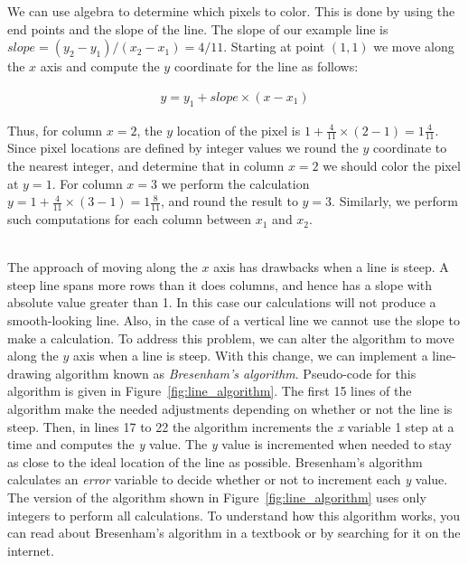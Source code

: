 \documentclass[epsfig,10pt,fullpage]{article}
\begin{document}
We can use algebra to determine which pixels to color. This is done by using the end points and 
the slope of the line. The slope of our example line is $slope = (y_2 - y_1)/(x_2 - x_1) = 4/11$. 
Starting at point $(1,1)$ we move along the $x$ axis and compute the $y$ coordinate for the 
line as follows:

\begin{eqnarray*}
y = y_1 + slope \times (x - x_1)
\end{eqnarray*}

Thus, for column $x = 2$, the $y$ location of the pixel is
$1 + \frac{4}{11} \times (2-1) = 1 \frac{4}{11}$. 
Since pixel locations are defined by integer values we round the $y$ coordinate to the nearest 
integer, and determine that in column $x = 2$ we should color the pixel at $y = 1$. For
column $x = 3$ we perform the calculation $y = 1 + \frac{4}{11} \times (3-1) = 1
\frac{8}{11}$, and round the result to $y = 3$.  Similarly, we perform such computations 
for each column between $x_1$ and $x_2$.

~\\
The approach of moving along the $x$ axis has drawbacks when a line is steep. A steep line
spans more rows than it does columns, and hence has a slope with absolute value greater than 
1.  In this case our calculations will not produce a smooth-looking line.  Also, in the case
of a vertical line we cannot use the slope to make a calculation.  To address this 
problem, we can alter the algorithm to move along the $y$ axis when a line is steep. With 
this change, we can implement a line-drawing algorithm known as {\it Bresenham's algorithm}.
Pseudo-code for this algorithm is given in Figure~\ref{fig:line_algorithm}. The first 15
lines of the algorithm make the needed adjustments depending on whether or not the line is
steep. Then, in lines 17 to 22 the algorithm increments the {\it x} variable 1 step at a time
and computes the {\it y} value. The {\it y} value is incremented when needed to stay as
close to the ideal location of the line as possible. Bresenham's algorithm calculates an
{\it error} variable to decide whether or not to increment each {\it y} value. The version
of the algorithm shown in Figure~\ref{fig:line_algorithm} uses only integers to perform
all calculations.  To understand how this algorithm works, you can read about Bresenham's
algorithm in a textbook or by searching for it on the internet.
\end{document}
